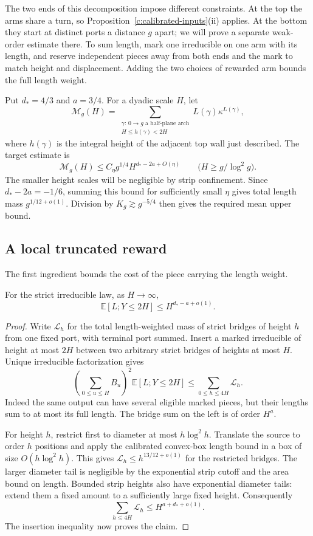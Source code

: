 The two ends of this decomposition impose different constraints. At the
top the arms share a turn, so Proposition~\ref{c:calibrated-inputs}(ii)
applies. At the bottom they start at distinct ports a distance $g$ apart;
we will prove a separate weak-order estimate there. To sum length, mark
one irreducible on one arm with its length, and reserve independent
pieces away from both ends and the mark to match height and displacement.
Adding the two choices of rewarded arm bounds the full length weight.

Put $d_*=4/3$ and $a=3/4$. For a dyadic scale $H$, let
\[
 \mathcal M_g(H)=
 \sum_{\substack{\gamma:\,0\to g\text{ a half-plane arch}\\
                  H\le h(\gamma)<2H}}
       L(\gamma)\kappa^{L(\gamma)},
\]
where $h(\gamma)$ is the integral height of the adjacent top wall just
described. The target estimate is
\begin{equation}\label{c:arch-dyadic-target}
 \mathcal M_g(H)\le C_\eta g^{1/4}H^{d_*-2a+O(\eta)}
 \qquad\bigl(H\ge g/\log^2g\bigr).
\end{equation}
The smaller height scales will be negligible by strip confinement.
Since $d_*-2a=-1/6$, summing this bound for sufficiently small $\eta$
gives total length mass $g^{1/12+o(1)}$. Division by
$K_g\gtrsim g^{-5/4}$ then gives the required mean upper bound.

\subsection{A local truncated reward}
The first ingredient bounds the cost of the piece carrying the length
weight.
\begin{lemma}\label{c:truncated-reward}
For the strict irreducible law, as $H\to\infty$,
\[
 \mathbb E[L; Y\le 2H]\le H^{d_*-a+o(1)} .
\]
\end{lemma}
\begin{proof}
Write $\mathcal L_h$ for the total length-weighted mass of strict bridges
of height $h$ from one fixed port, with terminal port summed. Insert a
marked irreducible of height at most $2H$ between two arbitrary strict
bridges of heights at most $H$. Unique irreducible factorization gives
\[
 \left(\sum_{0\le u\le H}B_u\right)^2
       \mathbb E[L;Y\le2H]
 \le \sum_{0\le h\le4H}\mathcal L_h.
\]
Indeed the same output can have several eligible marked pieces, but
their lengths sum to at most its full length. The bridge sum on the left
is of order $H^a$.

For height $h$, restrict first to diameter at most $h\log^2h$. Translate
the source to order $h$ positions and apply the calibrated convex-box
length bound in a box of size $O(h\log^2h)$. This gives
$\mathcal L_h\le h^{13/12+o(1)}$ for the restricted bridges. The larger
diameter tail is negligible by the exponential strip cutoff and the
area bound on length. Bounded strip heights also have exponential
diameter tails: extend them a fixed amount to a sufficiently large
fixed height. Consequently
\[
 \sum_{h\le4H}\mathcal L_h\le H^{a+d_*+o(1)}.
\]
The insertion inequality now proves the claim.
\end{proof}

